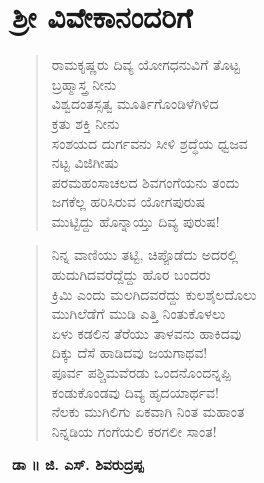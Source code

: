 
\chapter{ಶ್ರೀ ವಿವೇಕಾನಂದರಿಗೆ}

\begin{verse}
ರಾಮಕೃಷ್ಣರು ದಿವ್ಯ ಯೋಗಧನುವಿಗೆ ತೊಟ್ಟ\\ಬ್ರಹ್ಮಾಸ್ತ್ರ ನೀನು\\ವಿಶ್ವದಂತಸ್ಸತ್ವ ಮೂರ್ತಿಗೊಂಡಿಳೆಗಿಳಿದ\\ಕ್ರತು ಶಕ್ತಿ ನೀನು\\ಸಂಶಯದ ದುರ್ಗವನು ಸೀಳಿ ಶ್ರದ್ಧೆಯ ಧ್ವಜವ\\ನಟ್ಟ ವಿಜಿಗೀಷು\\ಪರಮಹಂಸಾಚಲದ ಶಿವಗಂಗೆಯನು ತಂದು\\ಜಗಕೆಲ್ಲ ಹರಿಸಿರುವ ಯೋಗಪುರುಷ\\ಮುಟ್ಟಿದ್ದು ಹೊನ್ನಾಯ್ತು ದಿವ್ಯ ಪುರುಷ!
\end{verse}

\begin{verse}
ನಿನ್ನ ವಾಣಿಯು ತಟ್ಟಿ, ಚಿಪ್ಪೊಡೆದು ಅದರಲ್ಲಿ\\ಹುದುಗಿದವರೆದ್ದೆದ್ದು ಹೊರ ಬಂದರು\\ಕ್ರಿಮಿ ಎಂದು ಮಲಗಿದವರೆದ್ದು ಕುಲಶೈಲದೊಲು\\ಮುಗಿಲೆಡೆಗೆ ಮುಡಿ ಎತ್ತಿ ನಿಂತುಕೊಳಲು\\ಏಳು ಕಡಲಿನ ತೆರೆಯು ತಾಳವನು ಹಾಕಿದವು\\ದಿಕ್ಕು ದೆಸೆ ಹಾಡಿದವು ಜಯಗಾಥವ!\\ಪೂರ್ವ ಪಶ್ಚಿಮವೆರಡು ಒಂದನೊಂದನ್ನಪ್ಪಿ\\ಕಂಡುಕೊಂಡವು ದಿವ್ಯ ಹೃದಯಾರ್ಥವ!\\ನೆಲಕು ಮುಗಿಲಿಗು ಏಕವಾಗಿ ನಿಂತ ಮಹಾಂತ\\ನಿನ್ನಡಿಯ ಗಂಗೆಯಲಿ ಕರಗಲೀ ಸಾಂತ!
\end{verse}

\begin{flushright}
\textbf{ಡಾ ॥ ಜಿ. ಎಸ್. ಶಿವರುದ್ರಪ್ಪ}
\end{flushright}

